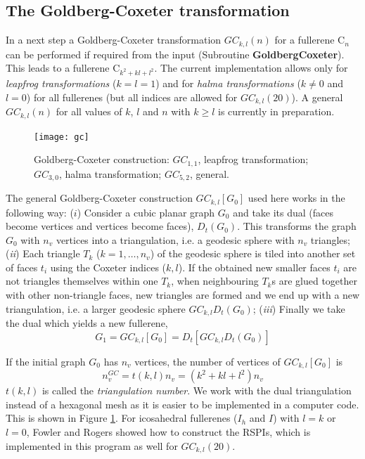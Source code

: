 \documentclass[article,a4paper,twoside]{memoir}
\newcommand{\C}[1]{\ensuremath{\mathrm{C}_{#1}}}
\newcommand{\funname}[1]{{\color{blue}\textbf{#1}}}
\begin{document}
\subsection{The Goldberg-Coxeter transformation}

In a next step a Goldberg-Coxeter transformation $GC_{k,l}(n)$ for a fullerene \C{n} can be performed if required from the input
(Subroutine \funname{GoldbergCoxeter}). This leads to a fullerene C$_{k^2+kl+l^2}$. The current implementation allows only for
\textit{leapfrog transformations} ($k=l=1$) and for \textit{halma transformations} ($k \neq 0$ and $l=0$) for all fullerenes
(but all indices are allowed for $GC_{k,l}(20)$). A general $GC_{k,l}(n)$ for all values of $k$, $l$ and $n$ with $k \geq l$ 
is currently in preparation. 


 \begin{figure}[htbp]
   	\centering
  	\texttt{[image: gc]}
    \caption{Goldberg-Coxeter construction: $GC_{1,1}$, leapfrog transformation; $GC_{3,0}$, halma transformation; $GC_{5,2}$, general.}
	\label{pic:GoldbergCoxeter}
 \end{figure}

The general Goldberg-Coxeter construction $GC_{k,l}[G_{0}]$ used here works in the following way: ($i$) Consider
a cubic planar graph $G_{0}$ and take its dual (faces become vertices and
vertices become faces), $D_{t}(G_{0})$. This transforms the graph $G_{0}$
with $n_v$ vertices into a triangulation, i.e. a geodesic sphere with $n_v$ triangles; (\textit{ii})
Each triangle $T_{k}$ ($k=1, \dots, n_{v}$) of the geodesic sphere is
tiled into another set of faces $t_i$ using the Coxeter indices ($k,l$).
If the obtained new smaller faces $t_i$ are not
triangles themselves within one $T_k$, when neighbouring $T_k$s are glued
together with other non-triangle faces, new triangles are formed and we end up with a new triangulation,
i.e. a larger geodesic sphere $GC_{k,l}D_{t}(G_{0})$;
(\textit{iii}) Finally we take the dual which yields a new fullerene,
\begin{equation}
 	G_1 = GC_{k,l}[G_0] = D_t[GC_{k,l} D_t(G_0)]
	\label{eq:GC}
\end{equation}

If the initial graph $G_0$ has $n_v$ vertices, the number of vertices of $GC_{k,l}[G_0]$ is
\begin{equation}
	n_v^{GC} = t(k,l)n_v = (k^2 + kl + l^2)n_v
	\label{eq:GCvertexcount} 
\end{equation}
$t(k,l)$ is called the {\em triangulation number}. We work with the dual triangulation instead of a hexagonal mesh as it is easier to be implemented in a computer code.
This is shown in Figure \ref{pic:GoldbergCoxeter}. For icosahedral fullerenes ($I_h$ and $I$) with $l = k$ or $l = 0$, Fowler and Rogers 
showed how to construct the RSPIs,\cite{Rogers} which is implemented in this program as well for $GC_{k,l}(20)$.
\end{document}
